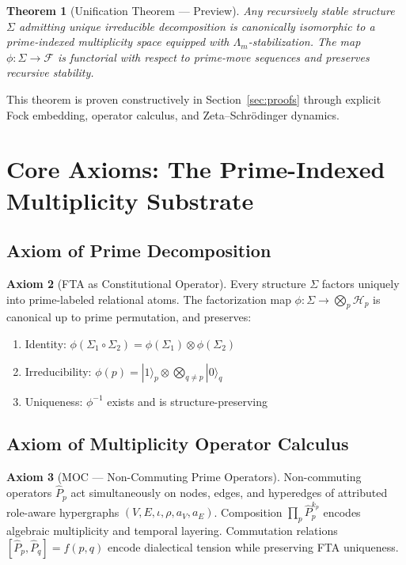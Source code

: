 \documentclass[11pt,a4paper]{article}
\theoremstyle{plain}
\newtheorem{theorem}{Theorem}[section]
\theoremstyle{definition}
\newtheorem{axiom}[theorem]{Axiom}
\theoremstyle{remark}
\begin{document}
\begin{theorem}[Unification Theorem --- Preview]\label{thm:unification}
Any recursively stable structure \(\Sigma\) admitting unique irreducible decomposition is canonically isomorphic to a prime-indexed multiplicity space equipped with \(\Lambda_m\)-stabilization. The map \(\phi: \Sigma \to \mathcal{F}\) is functorial with respect to prime-move sequences and preserves recursive stability.
\end{theorem}

This theorem is proven constructively in Section~\ref{sec:proofs} through explicit Fock embedding, operator calculus, and Zeta--Schr\"odinger dynamics.

\section{Core Axioms: The Prime-Indexed Multiplicity Substrate}

\subsection{Axiom of Prime Decomposition}

\begin{axiom}[FTA as Constitutional Operator]\label{ax:fta}
Every structure \(\Sigma\) factors uniquely into prime-labeled relational atoms. The factorization map \(\phi: \Sigma \to \bigotimes_p \mathcal{H}_p\) is canonical up to prime permutation, and preserves:
\begin{enumerate}[label=(\roman*)]
\item Identity: \(\phi(\Sigma_1 \circ \Sigma_2) = \phi(\Sigma_1) \otimes \phi(\Sigma_2)\)
\item Irreducibility: \(\phi(p) = |1\rangle_p \otimes \bigotimes_{q \neq p} |0\rangle_q\)
\item Uniqueness: \(\phi^{-1}\) exists and is structure-preserving
\end{enumerate}
\end{axiom}

\subsection{Axiom of Multiplicity Operator Calculus}

\begin{axiom}[MOC --- Non-Commuting Prime Operators]\label{ax:moc}
Non-commuting operators \(\hat{P}_p\) act simultaneously on nodes, edges, and hyperedges of attributed role-aware hypergraphs \((V, E, \iota, \rho, a_V, a_E)\). Composition \(\prod_p \hat{P}_p^{k_p}\) encodes algebraic multiplicity and temporal layering. Commutation relations \([\hat{P}_p, \hat{P}_q] = f(p,q)\) encode dialectical tension while preserving FTA uniqueness.
\end{axiom}
\end{document}
